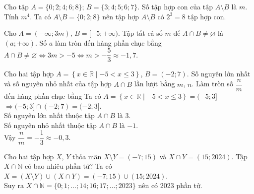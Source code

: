 \begin{ex}
	Cho tập $A=\{0;2;4;6;8\}$; $B=\{3;4;5;6;7\}$. Số tập hợp con của tập $A\setminus B$ là $m$. Tính $m^4$.
	\loigiai
	{
	Ta có $A\setminus B=\{0;2;8\}$ nên tập hợp $A\setminus B$ có $2^3=8$ tập hợp con.
	}
\end{ex}

\begin{ex}
	Cho $A=(-\infty;3m)$, $B=[-5;+\infty)$. Tập tất cả số $m$ để $A \cap B \ne \varnothing$ là $(a;+\infty)$. Số $a$ làm tròn đến hàng phần chục bằng
	\loigiai
	{
	$A \cap B \ne \varnothing \Leftrightarrow 3m> -5 \Leftrightarrow m> -\dfrac53 \approx -1,7$.
	}
\end{ex}

\begin{ex}
	Cho hai tập hợp $A=\left\{x\in \mathbb{R}\mid -5<x\leqslant 3\right\}$, $B=(-2; 7)$. Số nguyên lớn nhất và số nguyên nhỏ nhất của tập hợp $A\cap B$ lần lượt bằng $m$, $n$. Làm tròn số $\dfrac{n}{m}$ đến hàng phần chục bằng
	\loigiai
	{
	Ta có $A=\left\{x\in \mathbb{R}\mid -5<x\leqslant 3\right\}=(-5; 3]$ $ \Rightarrow (-5; 3]\cap (-2; 7)=(-2; 3]$.\\
	Số nguyên lớn nhất thuộc tập $A\cap B$ là $3$.\\
	Số nguyên nhỏ nhất thuộc tập $A\cap B$ là $-1$.\\
	Vậy $\dfrac{n}{m} = -\dfrac13 \approx -0,3$.
	}
\end{ex}

\begin{ex}%
	Cho hai tập hợp $X$, $Y$ thỏa mãn $X\setminus Y=(-7;15)$ và $X\cap Y=(15;2024)$. Tập $X \cap \mathbb{N}$ có bao nhiêu phần tử?
	\loigiai
	{
	Ta có $X = (X \setminus Y) \cup (X \cap Y) = (-7;15) \cup (15;2024)$.\\
	Suy ra $X \cap \mathbb{N} = \{0;1;\ldots;14;16;17;\ldots;2023 \}$ nên có $2023$ phần tử.
	}
\end{ex}

